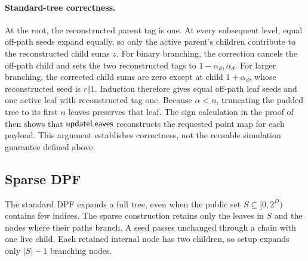 \paragraph{Standard-tree correctness.}
At the root, the reconstructed parent tag is one. At every subsequent
level, equal off-path seeds expand equally, so only the active parent's
children contribute to the reconstructed child sums $z$.
For binary branching, the correction cancels the off-path child and sets
the two reconstructed tags to $1-\alpha_d,\alpha_d$.
For larger branching, the corrected child sums are zero except at
child $1+\alpha_d$, whose reconstructed seed is $r\Vert1$.
Induction therefore gives equal off-path leaf seeds and one active leaf
with reconstructed tag one. Because $\alpha<n$, truncating the padded
tree to its first $n$ leaves preserves that leaf.
The sign calculation in the proof of 
then shows that $\textsf{updateLeaves}$ reconstructs the requested point map for
each payload. This argument establishes correctness, not the reusable
simulation guarantee defined above.

\subsection{Sparse DPF}\label{sec:sparse}

The standard DPF expands a full tree, even when the public set
$S\subseteq[0,2^D)$ contains few indices. The sparse construction retains only
the leaves in $S$ and the nodes where their paths branch. A seed passes
unchanged through a chain with one live child. Each retained internal node
has two children, so setup expands only $|S|-1$ branching nodes.


